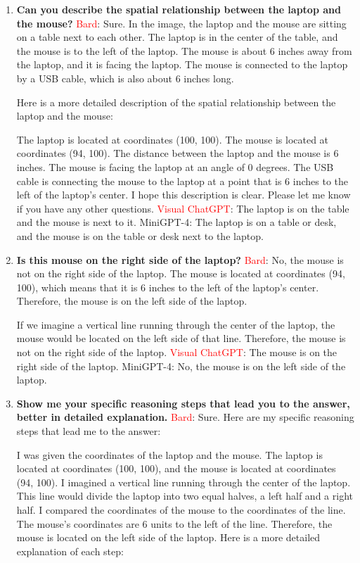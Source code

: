    \begin{enumerate}
        \item \textbf{Can you describe the spatial relationship between the laptop and the mouse?}
        \subitem \textcolor{Red}{Bard}:
        Sure. In the image, the laptop and the mouse are sitting on a table next to each other. The laptop is in the center of the table, and the mouse is to the left of the laptop. The mouse is about 6 inches away from the laptop, and it is facing the laptop. The mouse is connected to the laptop by a USB cable, which is also about 6 inches long.

        Here is a more detailed description of the spatial relationship between the laptop and the mouse:

        The laptop is located at coordinates (100, 100).
        The mouse is located at coordinates (94, 100).
        The distance between the laptop and the mouse is 6 inches.
        The mouse is facing the laptop at an angle of 0 degrees.
        The USB cable is connecting the mouse to the laptop at a point that is 6 inches to the left of the laptop's center.
        I hope this description is clear. Please let me know if you have any other questions.
        \subitem \textcolor{red}{Visual ChatGPT}: The laptop is on the table and the mouse is next to it.
        \subitem MiniGPT-4: The laptop is on a table or desk, and the mouse is on the table or desk next to the laptop.
        \item \textbf{Is this mouse on the right side of the laptop?}
        \subitem \textcolor{Red}{Bard}: 
        No, the mouse is not on the right side of the laptop. The mouse is located at coordinates (94, 100), which means that it is 6 inches to the left of the laptop's center. Therefore, the mouse is on the left side of the laptop.

        If we imagine a vertical line running through the center of the laptop, the mouse would be located on the left side of that line. Therefore, the mouse is not on the right side of the laptop.
        \subitem \textcolor{red}{Visual ChatGPT}: The mouse is on the right side of the laptop.
        \subitem MiniGPT-4: No, the mouse is on the left side of the laptop.
        \item \textbf{Show me your specific reasoning steps that lead you to the answer, better in detailed explanation.}
        \subitem \textcolor{Red}{Bard}:
        Sure. Here are my specific reasoning steps that lead me to the answer:

        I was given the coordinates of the laptop and the mouse. The laptop is located at coordinates (100, 100), and the mouse is located at coordinates (94, 100).
        I imagined a vertical line running through the center of the laptop. This line would divide the laptop into two equal halves, a left half and a right half.
        I compared the coordinates of the mouse to the coordinates of the line. The mouse's coordinates are 6 units to the left of the line.
        Therefore, the mouse is located on the left side of the laptop.
        Here is a more detailed explanation of each step:


\end{enumerate}
